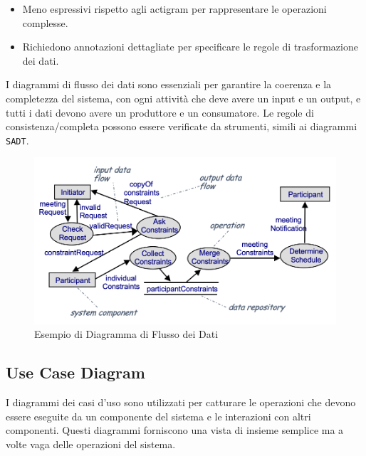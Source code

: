 \begin{tcolorbox}[colback=red!5!white,colframe=red!75!black,title=Svantaggi dei Diagrammi
    di Flusso dei Dati]
    \begin{itemize}
        \item Meno espressivi rispetto agli actigram per rappresentare le operazioni
        complesse.
        \item Richiedono annotazioni dettagliate per specificare le regole di
        trasformazione dei dati.
    \end{itemize}
\end{tcolorbox}

I diagrammi di flusso dei dati sono essenziali per garantire la coerenza e la
completezza del sistema, con ogni attività che deve avere un input e un output,
e tutti i dati devono avere un produttore e un consumatore. Le regole di
consistenza/completa possono essere verificate da strumenti, simili ai diagrammi \texttt{SADT}.
\begin{figure}[H]
    \centering
    \includegraphics[scale=0.35]{img/dfd.png}
    \caption{Esempio di Diagramma di Flusso dei Dati}
\end{figure}
\subsection{Use Case Diagram}
I diagrammi dei casi d'uso sono utilizzati per catturare le operazioni che devono essere eseguite da un componente del sistema e le interazioni con altri componenti. Questi diagrammi forniscono una vista di insieme semplice ma a volte vaga delle operazioni del sistema.

